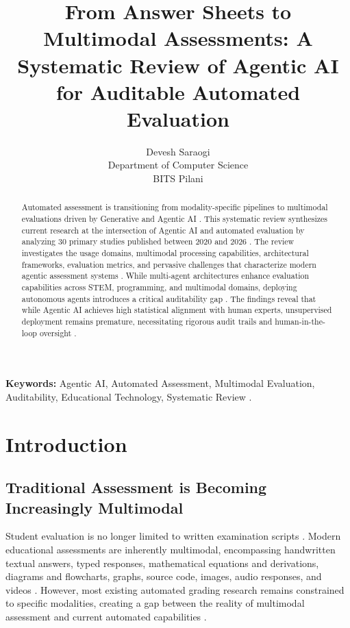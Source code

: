 \documentclass[11pt,a4paper]{article}
\title{From Answer Sheets to Multimodal Assessments: A Systematic Review of Agentic AI for Auditable Automated Evaluation}
\author{
    Devesh Saraogi \\
    Department of Computer Science \\
    BITS Pilani
}
\date{}
\begin{document}
\maketitle

\begin{abstract}
Automated assessment is transitioning from modality-specific pipelines to multimodal evaluations driven by Generative and Agentic AI \cite{P013}. This systematic review synthesizes current research at the intersection of Agentic AI and automated evaluation by analyzing 30 primary studies published between 2020 and 2026 \cite{P001, P013}. The review investigates the usage domains, multimodal processing capabilities, architectural frameworks, evaluation metrics, and pervasive challenges that characterize modern agentic assessment systems \cite{P015, P020}. While multi-agent architectures enhance evaluation capabilities across STEM, programming, and multimodal domains, deploying autonomous agents introduces a critical auditability gap \cite{P008, P027}. The findings reveal that while Agentic AI achieves high statistical alignment with human experts, unsupervised deployment remains premature, necessitating rigorous audit trails and human-in-the-loop oversight \cite{P014, P019}.
\end{abstract}

\textbf{Keywords:} Agentic AI, Automated Assessment, Multimodal Evaluation, Auditability, Educational Technology, Systematic Review \cite{P013}.

\section{Introduction}

\subsection{Traditional Assessment is Becoming Increasingly Multimodal}
Student evaluation is no longer limited to written examination scripts \cite{P022}. Modern educational assessments are inherently multimodal, encompassing handwritten textual answers, typed responses, mathematical equations and derivations, diagrams and flowcharts, graphs, source code, images, audio responses, and videos \cite{P004, P020, P029}. However, most existing automated grading research remains constrained to specific modalities, creating a gap between the reality of multimodal assessment and current automated capabilities \cite{P013, P016}.
\end{document}
